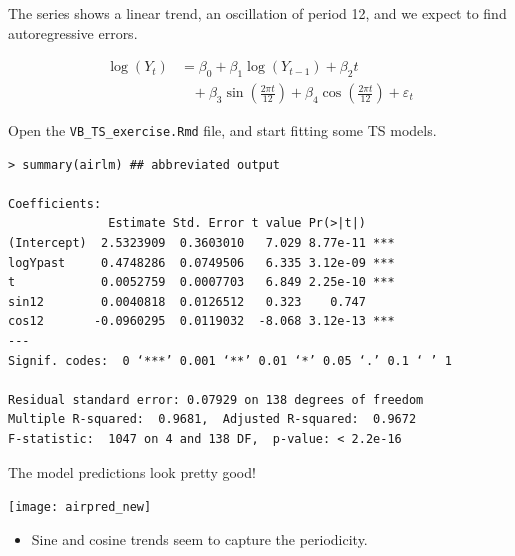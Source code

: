 \documentclass[12pt,xcolor=svgnames]{beamer}
\newcommand{\rd}{\color{red}}
\newcommand{\bl}{\color{blue}}
\newcommand{\sk}{\vspace{.4cm}}
\newcommand{\nochap}{\vspace{0.5cm}}
\newcommand{\nsk}{\vspace{-.4cm}}
\begin{document}
\begin{frame}[fragile]
\nochap

The series shows a linear trend, an oscillation of period 12, 
and we expect to find autoregressive errors.  

\nsk
{\rd 
\begin{align*}
\log(Y_t) &= \beta_0 + \beta_1 \log(Y_{t-1}) + \beta_2t \\
&\;\;\; + \beta_3\sin\left(\frac{2\pi t }{12}\right) + \beta_4\cos\left(\frac{2\pi t }{12}\right)
+ \varepsilon_t 
\end{align*}
}

\sk
Open the {\tt \bl VB\_TS\_exercise.Rmd} file, and start fitting some TS models.


\end{frame}

\iffalse 
\begin{frame}[fragile]
\nochap

\vspace{-0.25cm}
{\bl \footnotesize
\begin{verbatim}
> summary(airlm) ## abbreviated output

Coefficients:
              Estimate Std. Error t value Pr(>|t|)    
(Intercept)  2.5323909  0.3603010   7.029 8.77e-11 ***
logYpast     0.4748286  0.0749506   6.335 3.12e-09 ***
t            0.0052759  0.0007703   6.849 2.25e-10 ***
sin12        0.0040818  0.0126512   0.323    0.747    
cos12       -0.0960295  0.0119032  -8.068 3.12e-13 ***
---
Signif. codes:  0 ‘***’ 0.001 ‘**’ 0.01 ‘*’ 0.05 ‘.’ 0.1 ‘ ’ 1

Residual standard error: 0.07929 on 138 degrees of freedom
Multiple R-squared:  0.9681,  Adjusted R-squared:  0.9672 
F-statistic:  1047 on 4 and 138 DF,  p-value: < 2.2e-16
\end{verbatim}
}

\end{frame}

\begin{frame}
\nochap

\vspace{-0.35cm}
The model predictions look pretty good!
\begin{center}
\texttt{[image: airpred\_new]}
\end{center}

\nsk
\begin{itemize}
\item Sine and cosine trends seem to capture the periodicity.
\end{itemize}

\end{frame}
\end{document}
